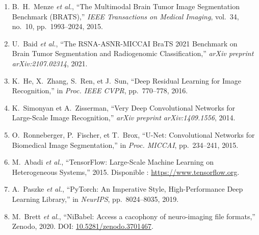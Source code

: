 \documentclass[12pt, a4paper]{report}
\begin{document}
\begin{enumerate}

  \item B.~H.~Menze \textit{et al.},
        ``The Multimodal Brain Tumor Image Segmentation Benchmark (BRATS),''
        \textit{IEEE Transactions on Medical Imaging}, vol.~34, no.~10,
        pp.~1993--2024, 2015.

  \item U.~Baid \textit{et al.},
        ``The RSNA-ASNR-MICCAI BraTS 2021 Benchmark on Brain Tumor Segmentation
        and Radiogenomic Classification,''
        \textit{arXiv preprint arXiv:2107.02314}, 2021.

  \item K.~He, X.~Zhang, S.~Ren, et J.~Sun,
        ``Deep Residual Learning for Image Recognition,''
        in \textit{Proc. IEEE CVPR}, pp.~770--778, 2016.

  \item K.~Simonyan et A.~Zisserman,
        ``Very Deep Convolutional Networks for Large-Scale Image Recognition,''
        \textit{arXiv preprint arXiv:1409.1556}, 2014.

  \item O.~Ronneberger, P.~Fischer, et T.~Brox,
        ``U-Net: Convolutional Networks for Biomedical Image Segmentation,''
        in \textit{Proc. MICCAI}, pp.~234--241, 2015.

  \item M.~Abadi \textit{et al.}, ``TensorFlow: Large-Scale Machine Learning
        on Heterogeneous Systems,'' 2015. Disponible : \url{https://www.tensorflow.org}.

  \item A.~Paszke \textit{et al.}, ``PyTorch: An Imperative Style, High-Performance
        Deep Learning Library,'' in \textit{NeurIPS}, pp.~8024--8035, 2019.

  \item M.~Brett \textit{et al.}, ``NiBabel: Access a cacophony of neuro-imaging
        file formats,'' Zenodo, 2020. DOI: \href{https://doi.org/10.5281/zenodo.3701467}{10.5281/zenodo.3701467}.

\end{enumerate}
\end{document}
